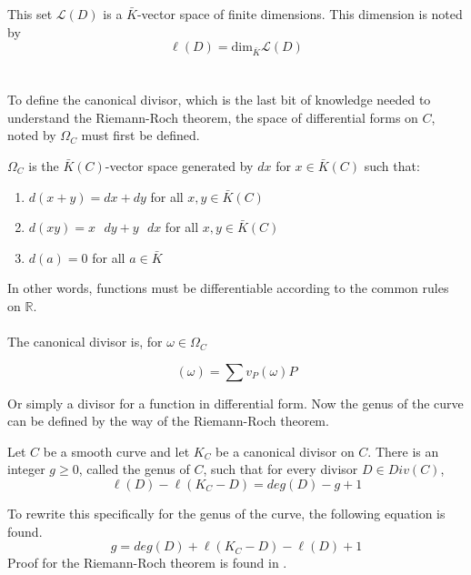 This set $\mathcal{L}(D)$ is a $\bar{K}$-vector space of finite dimensions. This dimension is noted by
\begin{equation*}
\ell(D)=\text{dim}_{\bar{K}}\mathcal{L}(D)
\end{equation*}
\\
\\
To define the canonical divisor, which is the last bit of knowledge needed to understand the Riemann-Roch theorem, the space of differential forms on $C$, noted by $\Omega_C$ must first be defined.

\begin{defn}
	$\Omega_C$ is the $\bar{K}(C)$-vector space generated by $dx$ for $x\in\bar{K}(C)$ such that:
	\begin{enumerate}
		\item $d(x+y)=dx+dy$ for all $x,y\in\bar{K}(C)$
		\item $d(xy)=x\text{ }dy+y\text{ }dx$ for all $x,y\in\bar{K}(C)$
		\item $d(a)=0$ for all $a\in\bar{K}$
	\end{enumerate}
\end{defn}
In other words, functions must be differentiable according to the common rules on $\mathbb{R}$.
\\
\\
The canonical divisor is, for $\omega\in\Omega_C$
\begin{defn}
	\begin{equation*}
	(\omega)=\sum v_P(\omega)P
	\end{equation*}
\end{defn}
Or simply a divisor for a function in differential form.
Now the genus of the curve can be defined by the way of the Riemann-Roch theorem.
\begin{thm} \label{RiemannRoch}
	Let $C$ be a smooth curve and let $K_C$ be a canonical divisor on $C$. There is an integer $g\geq0$, called the genus of $C$, such that for every divisor $D\in Div(C)$,
	\begin{equation*}
	\ell(D)-\ell(K_C-D)=deg(D)-g+1
	\end{equation*}
\end{thm}
To rewrite this specifically for the genus of the curve, the following equation is found.
\begin{equation*}
g=deg(D)+\ell(K_C-D)-\ell(D)+1
\end{equation*}
Proof for the Riemann-Roch theorem is found in \cite{RiemannRoch}.


